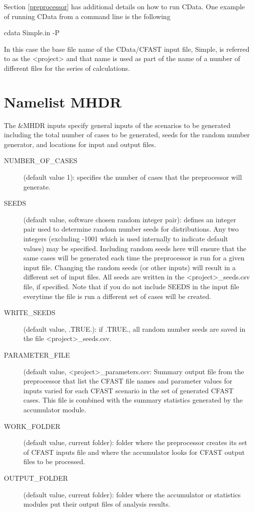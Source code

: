 \documentclass[12pt,twoside]{book}
\begin{document}
Section \ref{preprocessor} has additional details on how to run CData. One example of running CData from a command line is the following

\vspace{\baselineskip}
{\ct cdata Simple.in -P}
\vspace{\baselineskip}

In this case the base file name of the CData/CFAST input file, {\ct Simple}, is referred to as the {\ct <project>} and that name is used as part of the name of a number of different files for the series of calculations.

\section{Namelist MHDR}
\label{info:MHDR}

The {\ct \&MHDR} inputs specify general inputs of the scenarios to be generated including the total number of cases to be generated, seeds for the random number generator, and locations for input and output files.

\begin{description}
  \item[NUMBER\_OF\_CASES] (default value 1): specifies the number of cases that the preprocessor will generate.
  \item[SEEDS] (default value, software chosen random integer pair): defines an integer pair used to determine random number seeds for distributions. Any two integers (excluding -1001 which is used internally to indicate default values) may be specified. Including random seeds here will ensure that the same cases will be generated each time the preprocessor is run for a given input file. Changing the random seeds (or other inputs) will result in a different set of input files.  All seeds are written in the {\ct <project>\_seeds.csv} file, if specified. Note that if you do not include {\ct SEEDS} in the input file everytime the file is run a different set of cases will be created.
  \item[WRITE\_SEEDS] (default value, .TRUE.): if .TRUE., all random number seeds are saved in the file {\ct <project>\_seeds.csv}.
  \item[PARAMETER\_FILE] (default value, {\ct <project>\_parameters.csv}: Summary output file from the preprocessor that list the CFAST file names and parameter values for inputs varied for each CFAST scenario in the set of generated CFAST cases. This file is combined with the summary statistics generated by the accumulator module.
  \item[WORK\_FOLDER] (default value, current folder): folder where the preprocessor creates its set of CFAST inputs file and where the accumulator looks for CFAST output files to be processed.
  \item[OUTPUT\_FOLDER] (default value, current folder): folder where the accumulator or statistics modules put their output files of analysis results.
\end{description}
\end{document}
